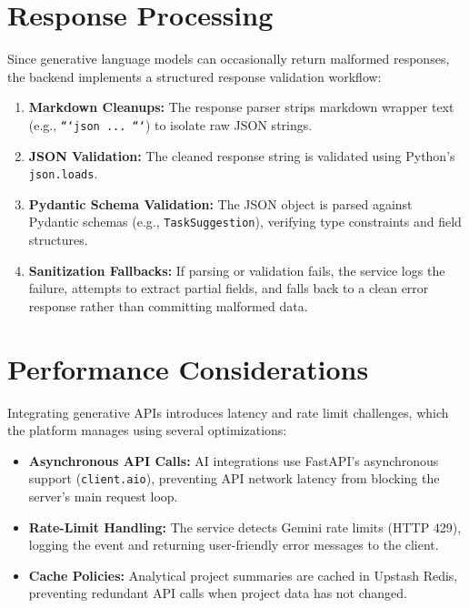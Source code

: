 \section{Response Processing}
Since generative language models can occasionally return malformed responses, the backend implements a structured response validation workflow:
\begin{enumerate}
    \item \textbf{Markdown Cleanups:} The response parser strips markdown wrapper text (e.g., \texttt{```json ... ```}) to isolate raw JSON strings.
    \item \textbf{JSON Validation:} The cleaned response string is validated using Python's \texttt{json.loads}.
    \item \textbf{Pydantic Schema Validation:} The JSON object is parsed against Pydantic schemas (e.g., \texttt{TaskSuggestion}), verifying type constraints and field structures.
    \item \textbf{Sanitization Fallbacks:} If parsing or validation fails, the service logs the failure, attempts to extract partial fields, and falls back to a clean error response rather than committing malformed data.
\end{enumerate}

\section{Performance Considerations}
Integrating generative APIs introduces latency and rate limit challenges, which the platform manages using several optimizations:
\begin{itemize}
    \item \textbf{Asynchronous API Calls:} AI integrations use FastAPI's asynchronous support (\texttt{client.aio}), preventing API network latency from blocking the server's main request loop.
    \item \textbf{Rate-Limit Handling:} The service detects Gemini rate limits (HTTP 429), logging the event and returning user-friendly error messages to the client.
    \item \textbf{Cache Policies:} Analytical project summaries are cached in Upstash Redis, preventing redundant API calls when project data has not changed.
\end{itemize}

